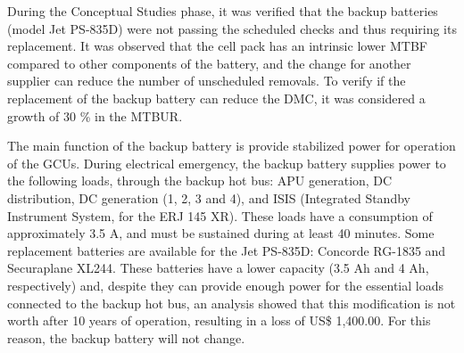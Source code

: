 ﻿%
During the Conceptual Studies phase, it was verified that the backup batteries (model Jet PS-835D) were not passing the scheduled checks and thus requiring its replacement. It was observed that the cell pack has an intrinsic lower MTBF compared to other components of the battery, and the change for another supplier can reduce the number of unscheduled removals. To verify if the replacement of the backup battery can reduce the DMC, it was considered a growth of 30 \% in the MTBUR.

The main function of the backup battery is provide stabilized power for operation of the GCUs. During electrical emergency, the backup battery supplies power to the following loads, through the backup hot bus: APU generation, DC distribution, DC generation (1, 2, 3 and 4), and ISIS (Integrated Standby Instrument System, for the ERJ 145 XR). These loads have a consumption of approximately 3.5 A, and must be sustained during at least 40 minutes. Some replacement batteries are available for the Jet PS-835D: Concorde RG-1835 and Securaplane XL244. These batteries have a lower capacity (3.5 Ah and 4 Ah, respectively) and, despite they can provide enough power for the essential loads connected to the backup hot bus, an analysis showed that this modification is not worth after 10 years of operation, resulting in a loss of US\$ 1,400.00. For this reason, the backup battery will not change.

